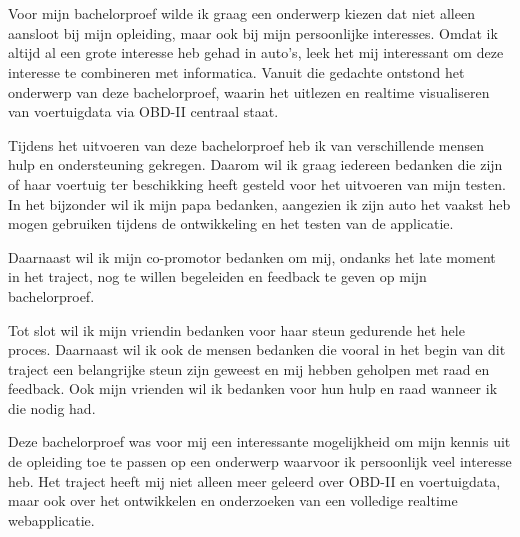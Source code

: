 \chapter*{}%
\label{ch:voorwoord}

Voor mijn bachelorproef wilde ik graag een onderwerp kiezen dat niet alleen
aansloot bij mijn opleiding, maar ook bij mijn persoonlijke interesses. Omdat
ik altijd al een grote interesse heb gehad in auto's, leek het mij interessant
om deze interesse te combineren met informatica. Vanuit die gedachte ontstond
het onderwerp van deze bachelorproef, waarin het uitlezen en realtime
visualiseren van voertuigdata via OBD-II centraal staat.

Tijdens het uitvoeren van deze bachelorproef heb ik van verschillende mensen
hulp en ondersteuning gekregen. Daarom wil ik graag iedereen bedanken die zijn
of haar voertuig ter beschikking heeft gesteld voor het uitvoeren van mijn
testen. In het bijzonder wil ik mijn papa bedanken, aangezien ik zijn auto het
vaakst heb mogen gebruiken tijdens de ontwikkeling en het testen van de
applicatie.

Daarnaast wil ik mijn co-promotor bedanken om mij, ondanks het late moment in
het traject, nog te willen begeleiden en feedback te geven op mijn bachelorproef.

Tot slot wil ik mijn vriendin bedanken voor haar steun gedurende het hele proces. 
Daarnaast wil ik ook de mensen bedanken die vooral in het begin van dit traject een belangrijke steun zijn geweest en mij hebben geholpen met raad en feedback. 
Ook mijn vrienden wil ik bedanken voor hun hulp en raad wanneer ik die nodig had.

Deze bachelorproef was voor mij een interessante mogelijkheid om mijn kennis
uit de opleiding toe te passen op een onderwerp waarvoor ik persoonlijk veel
interesse heb. Het traject heeft mij niet alleen meer geleerd over OBD-II en
voertuigdata, maar ook over het ontwikkelen en onderzoeken van een volledige
realtime webapplicatie.
